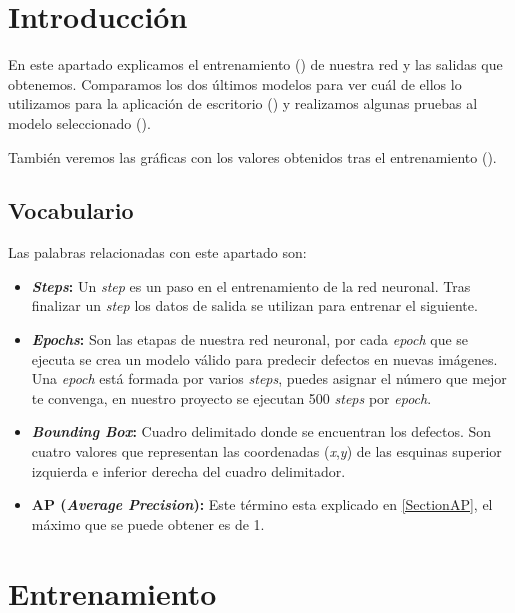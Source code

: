 
\section{Introducción}

En este apartado explicamos el entrenamiento () de nuestra red y las salidas que obtenemos. Comparamos los dos últimos modelos para ver cuál de ellos lo utilizamos para la aplicación de escritorio () y realizamos algunas pruebas al modelo seleccionado ().

También veremos las gráficas con los valores obtenidos tras el entrenamiento ().

\subsection{Vocabulario}

Las palabras relacionadas con este apartado son:

\begin{itemize}
    \item \textbf{\textit{Steps}:} Un \textit{step} es un paso en el entrenamiento de la red neuronal. Tras finalizar un \textit{step} los datos de salida se utilizan para entrenar el siguiente.
    \item \textbf{\textit{Epochs}:} Son las etapas de nuestra red neuronal, por cada \textit{epoch} que se ejecuta se crea un modelo válido para  predecir defectos en nuevas imágenes. Una \textit{epoch} está formada por varios \textit{steps}, puedes asignar el número que mejor te convenga, en nuestro proyecto se ejecutan 500 \textit{steps} por \textit{epoch}.
    \item \textbf{\textit{Bounding Box}:} Cuadro delimitado donde se encuentran los defectos. Son cuatro valores que representan las coordenadas (\textit{x},\textit{y}) de las esquinas superior izquierda e inferior derecha del cuadro delimitador.
    \item \textbf{AP (\textit{Average Precision}):} Este término esta explicado en \ref{SectionAP}, el máximo que se puede obtener es de 1.
\end{itemize}

\section{Entrenamiento\label{SectionEntrenamiento}}

